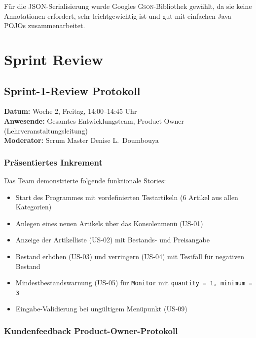 \documentclass[12pt, a4paper, twoside]{report}
\begin{document}
Für die JSON-Serialisierung wurde Googles \textsc{Gson}-Bibliothek gewählt, da sie keine
Annotationen erfordert, sehr leichtgewichtig ist und gut mit einfachen Java-POJOs
zusammenarbeitet.

\chapter{Sprint Review}
\label{chap:review}

\section{Sprint-1-Review \textendash{} Protokoll}

\textbf{Datum:} Woche 2, Freitag, 14:00--14:45 Uhr\\
\textbf{Anwesende:} Gesamtes Entwicklungsteam, Product Owner (Lehrveranstaltungsleitung)\\
\textbf{Moderator:} Scrum Master Denise L.\ Doumbouya

\subsection{Präsentiertes Inkrement}

Das Team demonstrierte folgende funktionale Stories:

\begin{itemize}[leftmargin=1.5em]
  \item Start des Programmes mit vordefinierten Testartikeln (6 Artikel aus allen Kategorien)
  \item Anlegen eines neuen Artikels über das Konsolenmenü (US-01)
  \item Anzeige der Artikelliste (US-02) mit Bestands- und Preisangabe
  \item Bestand erhöhen (US-03) und verringern (US-04) mit Testfall für negativen Bestand
  \item Mindestbestandswarnung (US-05) für \texttt{Monitor} mit \texttt{quantity = 1, minimum = 3}
  \item Eingabe-Validierung bei ungültigem Menüpunkt (US-09)
\end{itemize}

\subsection{Kundenfeedback \textendash{} Product-Owner-Protokoll}
\end{document}
